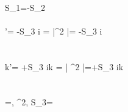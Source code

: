 \\
S_1=-S_2
\\\\
{\omega}'= -S_3  i \omega = \left |\beta^2 \right |=
-S_3 \frac {\beta}{\left | \beta \right |} \sqrt{} i\omega
\\
\\
\\
{k}'= +S_3  ik = \left | \beta^2 \right |=+S_3 \frac {\beta}{\left | \beta \right |} \sqrt{} ik
\\
\\
\\
\beta=, \beta^2, S_3= 

